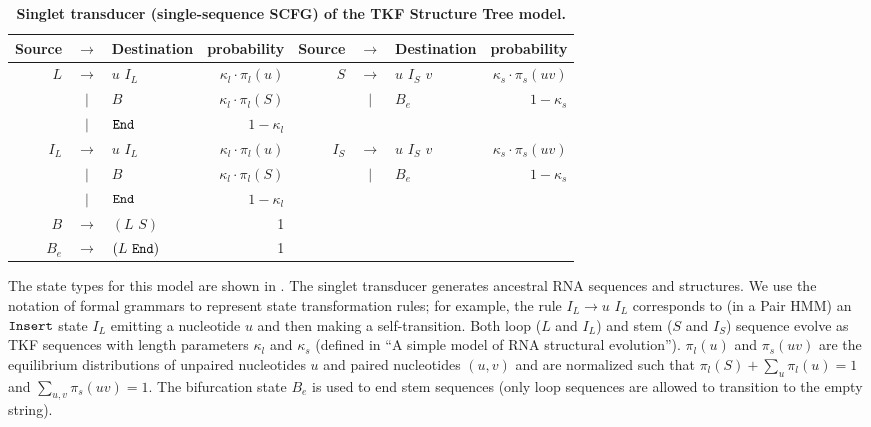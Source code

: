 \documentclass[10pt]{article}
\begin{document}
\begin{table}[!ht]
  \caption{
    \textbf{Singlet transducer (single-sequence SCFG) of the TKF Structure Tree model.}}
  \begin{tabular}{|rcl|r||rcl|r|}
    \hline
    Source & $\rightarrow$ & Destination & probability & Source & $\rightarrow$ & Destination & probability \\ \hline
    $L$ & $\rightarrow$ & $u \,\, I_L$ & $\kappa_l \cdot \pi_l(u)$ & $S$ & $\rightarrow$ & $u \,\, I_S \,\, v$ & $\kappa_s \cdot \pi_s(uv)$ \\ \hline
    & $|$ & $B$ & $\kappa_l \cdot \pi_l(S)$ & & $|$ & $B_e$ & $1-\kappa_s$ \\ \hline
    & $|$ & $\mathtt{End}$ & $1-\kappa_l$ & & & & \\ \hline
    $I_L$ & $\rightarrow$ & $u \, \, I_L$ & $\kappa_l \cdot \pi_l(u)$ & $I_S$ & $\rightarrow$ & $u \,\, I_S \,\, v$ & $\kappa_s \cdot \pi_s(uv)$\\ \hline
    & $|$ & $B$ & $\kappa_l \cdot \pi_l(S)$ & & $|$ & $B_e$ & $1-\kappa_s$\\ \hline
    & $|$ & $\mathtt{End}$ & $1-\kappa_l$ & & & & \\ \hline \hline
    $B$ & $\rightarrow$ & $(L \,\, S)$ & 1 & & & & \\ \hline
    $B_e$ & $\rightarrow$ & $(L \,\, \mathtt{End})$ & 1 & & & & \\ \hline
  \end{tabular}
  \begin{flushleft}
    The state types for this model are shown in
    .  The singlet transducer generates
    ancestral RNA sequences and structures.  We use the notation of
    formal grammars to represent state transformation rules; for
    example, the rule $I_L \rightarrow u\,\,I_L$ corresponds to (in a
    Pair HMM) an $\mathtt{Insert}$ state $I_L$ emitting a nucleotide $u$ and
    then making a self-transition.  Both loop ($L$ and $I_L$) and stem
    ($S$ and $I_S$) sequence evolve as TKF sequences with length
    parameters $\kappa_l$ and $\kappa_s$ (defined in ``A simple model
    of RNA structural evolution'').  $\pi_l(u)$ and $\pi_s(uv)$ are
    the equilibrium distributions of unpaired nucleotides $u$ and
    paired nucleotides $(u,v)$ and are normalized such that
    $\pi_l(S) + \sum_u \pi_l(u) = 1$ and $\sum_{u,v} \pi_s(uv) = 1$.  The bifurcation state $B_e$ is used
    to end stem sequences (only loop sequences are allowed to
    transition to the empty string).
  \end{flushleft}
\end{table}
\end{document}
